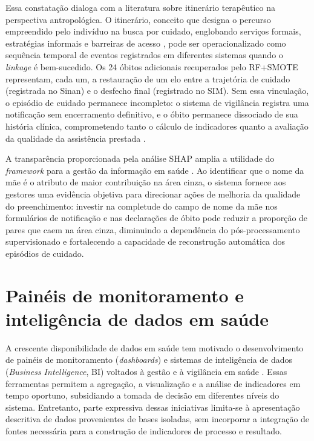 Essa constatação dialoga com a literatura sobre itinerário terapêutico na perspectiva antropológica. O itinerário, conceito que designa o percurso empreendido pelo indivíduo na busca por cuidado, englobando serviços formais, estratégias informais e barreiras de acesso \cite{Cabral2008itinerario, Gerhardt2006itinerario}, pode ser operacionalizado como sequência temporal de eventos registrados em diferentes sistemas quando o \textit{linkage} é bem-sucedido. Os 24 óbitos adicionais recuperados pelo RF+SMOTE representam, cada um, a restauração de um elo entre a trajetória de cuidado (registrada no Sinan) e o desfecho final (registrado no SIM). Sem essa vinculação, o episódio de cuidado permanece incompleto: o sistema de vigilância registra uma notificação sem encerramento definitivo, e o óbito permanece dissociado de sua história clínica, comprometendo tanto o cálculo de indicadores quanto a avaliação da qualidade da assistência prestada \cite{Bartholomay2020drtb}.

A transparência proporcionada pela análise SHAP amplia a utilidade do \textit{framework} para a gestão da informação em saúde \cite{Markus2021role}. Ao identificar que o nome da mãe é o atributo de maior contribuição na área cinza, o sistema fornece aos gestores uma evidência objetiva para direcionar ações de melhoria da qualidade do preenchimento: investir na completude do campo de nome da mãe nos formulários de notificação e nas declarações de óbito pode reduzir a proporção de pares que caem na área cinza, diminuindo a dependência do pós-processamento supervisionado e fortalecendo a capacidade de reconstrução automática dos episódios de cuidado.


\section{Painéis de monitoramento e inteligência de dados em saúde}\label{sec:paineis-bi}

A crescente disponibilidade de dados em saúde tem motivado o desenvolvimento de painéis de monitoramento (\textit{dashboards}) e sistemas de inteligência de dados (\textit{Business Intelligence}, BI) voltados à gestão e à vigilância em saúde \cite{Kimball2013dw}. Essas ferramentas permitem a agregação, a visualização e a análise de indicadores em tempo oportuno, subsidiando a tomada de decisão em diferentes níveis do sistema. Entretanto, parte expressiva dessas iniciativas limita-se à apresentação descritiva de dados provenientes de bases isoladas, sem incorporar a integração de fontes necessária para a construção de indicadores de processo e resultado.

